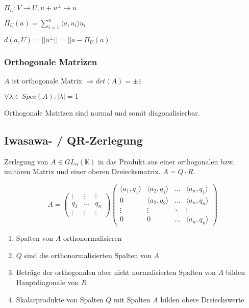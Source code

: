 \begin{description}[leftmargin=!,labelwidth=20mm]
	\item[Definition] $\Pi_U : V \rightarrow U, u + u^\perp \mapsto u$
	\item[Bestimmung] $\Pi_U(a) = \sum_{i=1}^n \langle a,u_i \rangle u_i$
	\item[Abstand]    $d(a, U) = ||u^\perp|| = ||a - \Pi_U(a)||$
\end{description}

\subsubsection*{Orthogonale Matrizen}

$A$ ist orthogonale Matrix $\Rightarrow det(A)=\pm 1$

$\forall \lambda \in Spec(A) : |\lambda| = 1$

Orthogonale Matrizen sind normal und somit diagonalisierbar.

\subsection*{Iwasawa- / QR-Zerlegung}

Zerlegung von $A \in GL_n(\mathbb{K})$ in das Produkt aus einer orthogonalen bzw. unitären Matrix und einer oberen Dreiecksmatrix. $A = Q \cdot R$.

\vspace*{-5mm}
$$A = \begin{pmatrix}
\vdots & \vdots & \vdots \\
q_1    & \hdots & q_n \\
\vdots & \vdots & \vdots
\end{pmatrix}
\begin{pmatrix}
\langle a_1, q_1 \rangle & \langle a_2, q_1 \rangle & \hdots & \langle a_n, q_1 \rangle \\
0                        & \langle a_2, q_2 \rangle & \hdots & \langle a_n, q_n \rangle \\
\vdots                   & \vdots                   & \ddots & \vdots                   \\
0                        & 0                        & \hdots & \langle a_n, q_n \rangle
\end{pmatrix}$$

\vspace*{-2mm}
\begin{enumerate}[leftmargin=4mm]
	\item Spalten von $A$ orthonormalisieren
	\item $Q$ sind die orthonormalisierten Spalten von $A$
	\item Beträge der orthogonalen aber nicht normalisierten Spalten von $A$ bilden Hauptdiagonale von $R$
	\item Skalarprodukte von Spalten $Q$ mit Spalten $A$ bilden obere Dreieckswerte
\end{enumerate}

